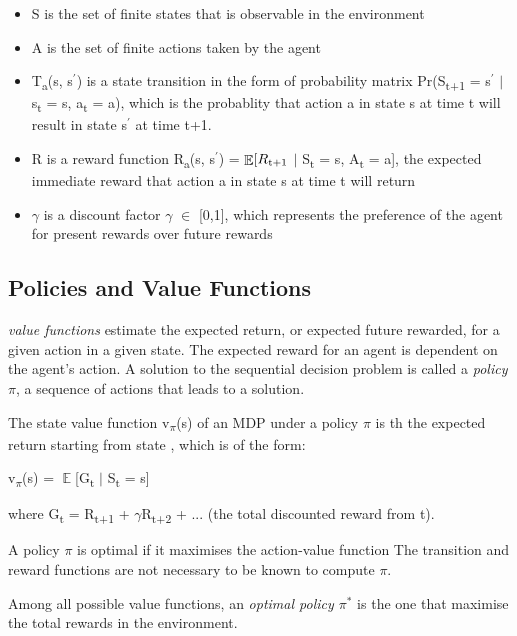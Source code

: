 \documentclass[12pt,twoside]{report}
\DeclareMathOperator{\E}{\mathbb{E}}
\begin{document}
\begin{itemize}
\item S is the set of finite states that is observable in the environment
\item A is the set of finite actions taken by the agent
\item T\textsubscript{a}(s, s$^\prime$) is a state transition in the form of probability matrix Pr(S\textsubscript{t+1} = s$^\prime$ $\vert$ s\textsubscript{t} = s, a\textsubscript{t} = a), which is the probablity that action a in state s at time t will result in state s$^\prime$ at time t+1.
\item R is a reward function R\textsubscript{a}(s, s$^\prime$) = $\displaystyle \E[R\textsubscript{t+1} $ $\vert$ S\textsubscript{t} = s, A\textsubscript{t} = a], the expected immediate reward that action a in state s at time t will return
\item $\gamma$ is a discount factor $\gamma$ $\in$ [0,1], which represents the preference of the agent for present rewards over future rewards
\end{itemize}

\subsection{Policies and Value Functions}
\textit{value functions} estimate the expected return, or expected future rewarded,  for a given action in a given state. The expected reward for an agent is dependent on the agent's action. A solution to the sequential decision problem is called a \textit{policy $\pi$}, a sequence of actions that leads to a solution.

The state value function v\textsubscript{$\pi$}(s) of an MDP under a policy $\pi$ is th the expected return starting from state , which is of the form:

v\textsubscript{$\pi$}(s) = $\displaystyle \E$[G\textsubscript{t} $\vert$ S\textsubscript{t} = s]

where G\textsubscript{t} = R\textsubscript{t+1} + $\gamma$R\textsubscript{t+2} + ... (the total discounted reward from t).

A policy $\pi$ is optimal if it maximises the action-value function
The transition and reward functions are not necessary to be known to compute $\pi$.

Among all possible value functions, an \textit{optimal policy $\pi^*$} is the one that maximise the total rewards in the environment.
\end{document}
